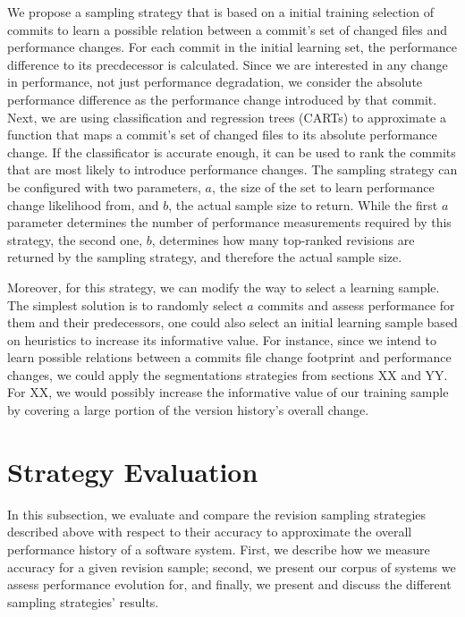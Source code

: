 We propose a sampling strategy that is based on a initial training selection of
commits to learn a possible relation between a commit’s set of changed files
and performance changes. For each commit in the initial learning set, the
performance difference to its precdecessor is calculated. Since we are
interested in any change in performance, not just performance degradation, we
consider the absolute performance difference as the performance change introduced by that
commit. Next, we are using classification and regression trees (CARTs) to
approximate a function that maps a commit’s set of changed files to its
absolute performance change. If the classificator is accurate enough, it can be
used to rank the commits that are most likely to introduce performance
changes. The sampling strategy can be configured with two parameters, $a$, the
size of the set to learn performance change likelihood from, and $b$, the
actual sample size to return. While the first $a$ parameter determines the
number of performance measurements required by this strategy, the second one,
$b$, determines how many top-ranked revisions are returned by the sampling
strategy, and therefore the actual sample size.

Moreover, for this strategy, we can modify the way to select a learning sample.
The simplest solution is to randomly select $a$ commits and assess performance
for them and their predecessors, one could also select an initial learning
sample based on heuristics to increase its informative value. For instance,
since we intend to learn possible relations between a commits file change
footprint and performance changes, we could apply the segmentations strategies
from sections XX and YY. For XX, we would possibly increase the informative
value of our training sample by covering a large portion of the version
history's overall change. 

\section{Strategy Evaluation}\label{sec:revsampling_eval}
In this subsection, we evaluate and compare the revision sampling strategies
described above with respect to their accuracy to approximate the overall
performance history of a software system. First, we  describe how we measure
accuracy for a given revision sample; second, we present our corpus of systems
we assess performance evolution for, and finally, we present and discuss the
different sampling strategies’ results.

